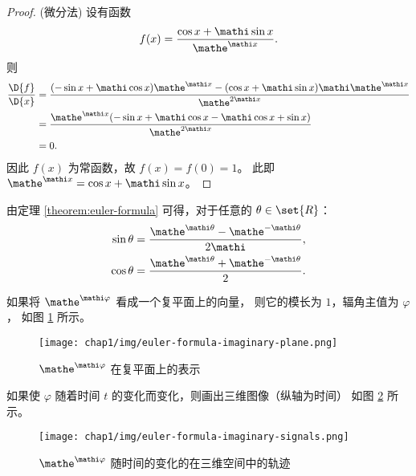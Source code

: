 \begin{proof}
    (微分法)
    设有函数
    \begin{align*}
        f(x) = \frac{\cos x + \mathi \sin x}{\mathe^{\mathi x}}.
    \end{align*}
    则
    \begin{align*}
        \frac{\D{f}}{\D{x}} & = \frac{(-\sin x + \mathi \cos x)\mathe^{\mathi x}
                    - (\cos x + \mathi \sin x)\mathi \mathe^{\mathi x}}
                    {\mathe^{2\mathi x}} \\
        & = \frac{\mathe^{\mathi x}(-\sin x + \mathi \cos x - \mathi \cos x + \sin x)}{\mathe^{2\mathi x}} \\
        & = 0.
    \end{align*}
    因此 $f(x)$ 为常函数，故 $f(x) = f(0) = 1$。
    此即 $\mathe^{\mathi x} = \cos x + \mathi \sin x$。
\end{proof}

\begin{corollary}
    由定理 \ref{theorem:euler-formula} 可得，对于任意的 $\theta \in \set{R}$：
    \begin{align*}
        \sin \theta & = \frac{\mathe^{\mathi\theta} - \mathe^{-\mathi\theta}}{2\mathi}, \\
        \cos \theta & = \frac{\mathe^{\mathi\theta} + \mathe^{-\mathi\theta}}{2}.
    \end{align*}
\end{corollary}

\begin{example}[复值信号的图示]
    如果将 $\mathe^{\mathi \varphi}$ 看成一个复平面上的向量，
    则它的模长为 $1$，辐角主值为 $\varphi$，
    如图 \ref{fig:euler-formula-imaginary-plane} 所示。
    \begin{figure}[H]
        \centering
        \texttt{[image: chap1/img/euler-formula-imaginary-plane.png]}
        \caption{$\mathe^{\mathi \varphi}$ 在复平面上的表示}
        \label{fig:euler-formula-imaginary-plane}
    \end{figure}

    如果使 $\varphi$ 随着时间 $t$ 的变化而变化，则画出三维图像（纵轴为时间）
    如图 \ref{fig:euler-formula-imaginary-signals.png} 所示。
    \begin{figure}[H]
        \centering
        \texttt{[image: chap1/img/euler-formula-imaginary-signals.png]}
        \caption{$\mathe^{\mathi \varphi}$ 随时间的变化的在三维空间中的轨迹}
        \label{fig:euler-formula-imaginary-signals.png}
    \end{figure}
\end{example}

